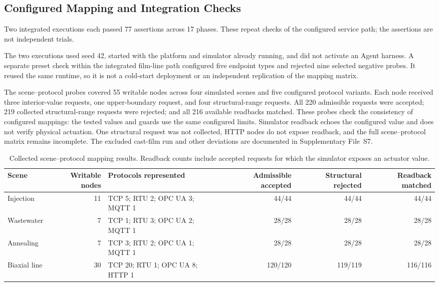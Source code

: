 \subsection{Configured Mapping and Integration Checks}
\label{sec:eval-mapping}
Two integrated executions each passed 77 assertions across 17 phases. These repeat checks of the configured service path; the assertions are not independent trials.

The two executions used seed 42, started with the platform and simulator already running, and did not activate an Agent harness. A separate preset check within the integrated film-line path configured five endpoint types and rejected nine selected negative probes. It reused the same runtime, so it is not a cold-start deployment or an independent replication of the mapping matrix.

The scene--protocol probes covered 55 writable nodes across four simulated scenes and five configured protocol variants. Each node received three interior-value requests, one upper-boundary request, and four structural-range requests. All 220 admissible requests were accepted; 219 collected structural-range requests were rejected; and all 216 available readbacks matched. These probes check the consistency of configured mappings: the tested values and guards use the same configured limits. Simulator readback echoes the configured value and does not verify physical actuation. One structural request was not collected, HTTP nodes do not expose readback, and the full scene--protocol matrix remains incomplete. The excluded cast-film run and other deviations are documented in Supplementary File~S7.

\begin{table}[!t]
\centering
\caption{Collected scene--protocol mapping results. Readback counts include accepted requests for which the simulator exposes an actuator value.}
\label{tab:scene-probe-results}
\footnotesize
\setlength{\tabcolsep}{4.5pt}
\begin{tabularx}{\textwidth}{@{}>{\raggedright\arraybackslash}p{1.65cm}r X r r r@{}}
\toprule
Scene & Writable nodes & Protocols represented & Admissible accepted & Structural rejected & Readback matched \\
\midrule
Injection & 11 & TCP 5; RTU 2; OPC UA 3; MQTT 1 & 44/44 & 44/44 & 44/44 \\
Wastewater & 7 & TCP 1; RTU 3; OPC UA 2; MQTT 1 & 28/28 & 28/28 & 28/28 \\
Annealing & 7 & TCP 3; RTU 2; OPC UA 1; MQTT 1 & 28/28 & 28/28 & 28/28 \\
Biaxial line & 30 & TCP 20; RTU 1; OPC UA 8; HTTP 1 & 120/120 & 119/119 & 116/116 \\
\bottomrule
\end{tabularx}
\end{table}

